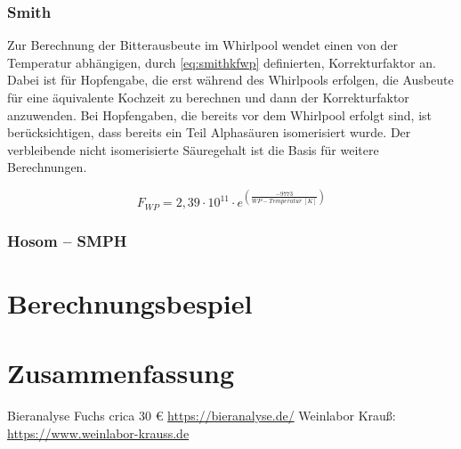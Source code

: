 \documentclass[a4paper,parskip=half]{scrartcl}
\begin{document}
\subsubsection*{Smith}

Zur Berechnung der Bitterausbeute im Whirlpool wendet \citeauthor{Smith2019}
einen von der Temperatur abhängigen, durch \autoref{eq:smithkfwp} definierten,
Korrekturfaktor an. Dabei ist für Hopfengabe, die erst während des Whirlpools
erfolgen, die Ausbeute für eine äquivalente Kochzeit zu berechnen und dann der
Korrekturfaktor anzuwenden. Bei Hopfengaben, die bereits vor dem Whirlpool erfolgt
sind, ist berücksichtigen, dass bereits ein Teil Alphasäuren isomerisiert wurde.
Der verbleibende nicht isomerisierte Säuregehalt ist die Basis für weitere
Berechnungen. \parencite{Smith2019}

\begin{equation}
\mathit{F}_{\mathit{WP}} = 2,39 \cdot 10^{11} \cdot e^{\left(\frac{-9773}{\mathit{WP-Temperatur}\:[K]} \right)}
\label{eq:smithkfwp}
\end{equation}

\subsubsection*{Hosom – SMPH}

\parencite{Hosom2021}

\section*{Berechnungsbespiel}

\section*{Zusammenfassung}

\parencite{Janish2019}
\parencite{Hieronymus2012}
\parencite{Nottebohm2020}
\parencite{Hall1997}
\parencite{Pyle1995}
\parencite{Justus2018}
\parencite{Parkin2017}
\parencite{Bishop1964}
\parencite{Nickerson1979}
\parencite{Calado2019}
\parencite{Weiss2019}

\parencite{Bruecklmeier2017}
\parencite{Bruecklmeier2018}

Bieranalyse Fuchs crica 30 € \url{https://bieranalyse.de/}
Weinlabor Krauß: \url{https://www.weinlabor-krauss.de}

\printbibliography[title=Quellen]
\end{document}

